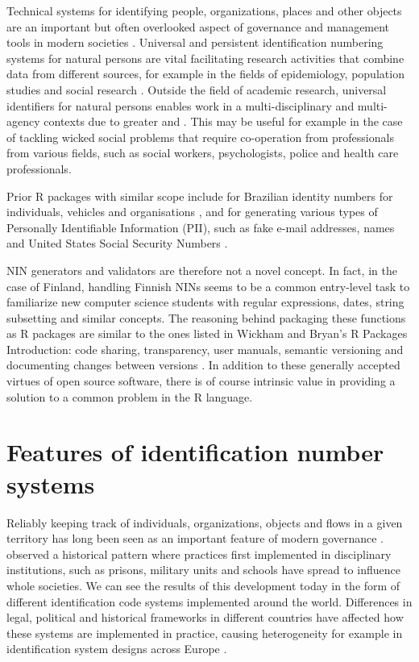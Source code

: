 Technical systems for identifying people, organizations, places and other objects are an important but often overlooked aspect of governance and management tools in modern societies \citep{dodge2005}. Universal and persistent identification numbering systems for natural persons are vital facilitating research activities that combine data from different sources, for example in the fields of epidemiology, population studies and social research \citep{gissler2004}. Outside the field of academic research, universal identifiers for natural persons enables work in a multi-disciplinary and multi-agency contexts due to greater  and  \citep{alastalo2022}. This may be useful for example in the case of tackling wicked social problems that require co-operation from professionals from various fields, such as social workers, psychologists, police and health care professionals.

Prior R packages with similar scope include  for Brazilian identity numbers for individuals, vehicles and organisations \citep{numbersbr}, and  for generating various types of Personally Identifiable Information (PII), such as fake e-mail addresses, names and United States Social Security Numbers \citep{generator}.

NIN generators and validators are therefore not a novel concept. In fact, in the case of Finland, handling Finnish NINs seems to be a common entry-level task to familiarize new computer science students with regular expressions, dates, string subsetting and similar concepts. The reasoning behind packaging these functions as R packages are similar to the ones listed in Wickham and Bryan's R Packages Introduction: code sharing, transparency, user manuals, semantic versioning and documenting changes between versions \citep{wickham2022}. In addition to these generally accepted virtues of open source software, there is of course intrinsic value in providing a solution to a common problem in the R language.

\section{Features of identification number systems}

Reliably keeping track of individuals, organizations, objects and flows in a given territory has long been seen as an important feature of modern governance \citep{dodge2005}. \citet[115-120]{foucault7778} observed a historical pattern where practices first implemented in disciplinary institutions, such as prisons, military units and schools have spread to influence whole societies. We can see the results of this development today in the form of different identification code systems implemented around the world. Differences in legal, political and historical frameworks in different countries have affected how these systems are implemented in practice, causing heterogeneity for example in identification system designs across Europe \citep{otjacques2007}. 

